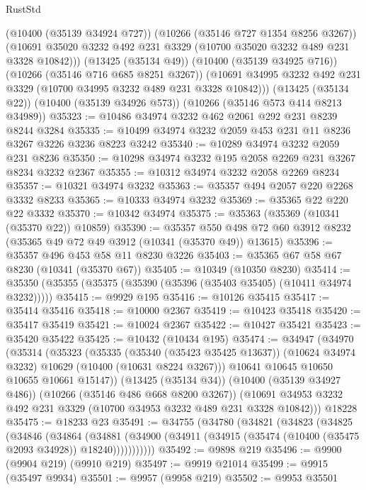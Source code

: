 \begin{lexlean}{RustStd}
\begin{coremodule}
{\begin{coremodule}
{{{{{{{{{{{{{{{{{{{{{{{{{        (@10400 (@35139 @34924 @727))
        (@10266 (@35146 @727 @1354 @8256 @3267))
        (@10691 @35020 @3232 @492 @231 @3329 (@10700 @35020 @3232 @489 @231 @3328 @10842)))
      (@13425 (@35134 @49))
      (@10400 (@35139 @34925 @716))
      (@10266 (@35146 @716 @685 @8251 @3267))
      (@10691 @34995 @3232 @492 @231 @3329 (@10700 @34995 @3232 @489 @231 @3328 @10842)))
    (@13425 (@35134 @22))
    (@10400 (@35139 @34926 @573))
    (@10266 (@35146 @573 @414 @8213 @34989))
@35323 := @10486 @34974 @3232 @462 @2061 @292 @231 @8239 @8244 @3284
@35335 := @10499 @34974 @3232 @2059 @453 @231 @11 @8236 @3267 @3226 @3236 @8223 @3242
@35340 := @10289 @34974 @3232 @2059 @231 @8236
@35350 := @10298 @34974 @3232 @195 @2058 @2269 @231 @3267 @8234 @3232 @2367
@35355 := @10312 @34974 @3232 @2058 @2269 @8234
@35357 := @10321 @34974 @3232
@35363 := @35357 @494 @2057 @220 @2268 @3332 @8233
@35365 := @10333 @34974 @3232
@35369 := @35365 @22 @220 @22 @3332
@35370 := @10342 @34974
@35375 := @35363 (@35369 (@10341 (@35370 @22)) @10859)
@35390 := @35357
    @550
    @498
    @72
    @60
    @3912
    @8232
    (@35365 @49 @72 @49 @3912 (@10341 (@35370 @49)) @13615)
@35396 := @35357 @496 @453 @58 @11 @8230 @3226
@35403 := @35365 @67 @58 @67 @8230 (@10341 (@35370 @67))
@35405 := @10349 (@10350 @8230)
@35414 := @35350 (@35355 (@35375 (@35390 (@35396 (@35403 @35405) (@10411 @34974 @3232)))))
@35415 := @9929 @195
@35416 := @10126 @35415
@35417 := @35414 @35416
@35418 := @10000 @2367
@35419 := @10423 @35418
@35420 := @35417 @35419
@35421 := @10024 @2367
@35422 := @10427 @35421
@35423 := @35420 @35422
@35425 := @10432 (@10434 @195)
@35474 := @34947
    (@34970
      (@35314
        (@35323
          (@35335
            (@35340 (@35423 @35425 @13637))
            (@10624 @34974 @3232)
            @10629
            (@10400 (@10631 @8224 @3267)))
          @10641
          @10645
          @10650
          @10655
          @10661
          @15147))
      (@13425 (@35134 @34))
      (@10400 (@35139 @34927 @486))
      (@10266 (@35146 @486 @668 @8200 @3267))
      (@10691 @34953 @3232 @492 @231 @3329 (@10700 @34953 @3232 @489 @231 @3328 @10842)))
    @18228
@35475 := @18233 @23
@35491 := @34755
    (@34780
      (@34821
        (@34823
          (@34825
            (@34846
              (@34864
                (@34881
                  (@34900 (@34911 (@34915 (@35474 (@10400 (@35475 @2093 @34928)) @18240)))))))))))
@35492 := @9898 @219
@35496 := @9900 (@9904 @219) (@9910 @219)
@35497 := @9919 @21014
@35499 := @9915 (@35497 @9934)
@35501 := @9957 (@9958 @219)
@35502 := @9953 @35501
}}}}}}}}}}}}}}}}}}}}}}}}}
\end{coremodule}}
\end{coremodule}
\end{lexlean}

